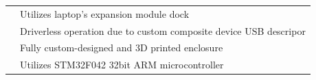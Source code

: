 \documentclass[lighthipster]{simplehipstercv}
\begin{document}
\begin{paracol}{2}
\begin{minipage}[t]{0.60\textwidth}
\begin{tabular}{l @{}l}
		\phantom{x}\tiny\phantom{xx}\faCircle
		& \hspace{2mm} Utilizes laptop's expansion module dock \\[1mm]
                
		\phantom{x}\tiny\phantom{xx}\faCircle
		& \hspace{2mm} Driverless operation due to custom composite 
							device USB descripor \\[1mm]
		
		\phantom{x}\tiny\phantom{xx}\faCircle
		& \hspace{2mm} Fully custom-designed and 3D printed enclosure \\[1mm]
                
		\phantom{x}\tiny\phantom{xx}\faCircle
		& \hspace{2mm} Utilizes STM32F042 32bit ARM microcontroller \\

	\end{tabular}



\end{minipage}
\end{paracol}
\end{document}

